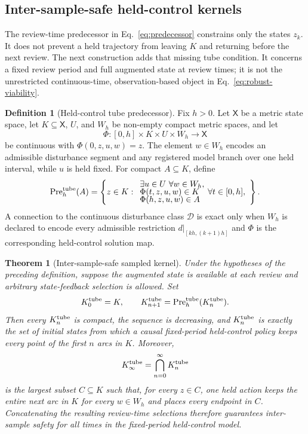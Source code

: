 \documentclass[11pt]{article}
\newtheorem{theorem}{Theorem}
\theoremstyle{definition}
\newtheorem{definition}{Definition}
\newcommand{\Pre}{\operatorname{Pre}}
\begin{document}
\subsection{Inter-sample-safe held-control kernels}

The review-time predecessor in Eq.~\eqref{eq:predecessor} constrains only the states $z_k$. It does not prevent a held trajectory from leaving $K$ and returning before the next review. The next construction adds that missing tube condition. It concerns a fixed review period and full augmented state at review times; it is not the unrestricted continuous-time, observation-based object in Eq.~\eqref{eq:robust-viability}.

\begin{definition}[Held-control tube predecessor]
Fix $h>0$. Let $\mathsf X$ be a metric state space, let $K\subseteq \mathsf X$, $U$, and $W_h$ be non-empty compact metric spaces, and let
\[
\Phi:[0,h]\times K\times U\times W_h\to \mathsf X
\]
be continuous with $\Phi(0,z,u,w)=z$. The element $w\in W_h$ encodes an admissible disturbance segment and any registered model branch over one held interval, while $u$ is held fixed. For compact $A\subseteq K$, define
\begin{equation}
\Pre_h^{\rm tube}(A)=
\left\{z\in K:\begin{array}{l}
\exists u\in U\ \forall w\in W_h,\\[-1mm]
\Phi(t,z,u,w)\in K\quad\forall t\in[0,h],\\[-1mm]
\Phi(h,z,u,w)\in A
\end{array}\right\}.
\label{eq:tube-predecessor}
\end{equation}
A connection to the continuous disturbance class $\mathcal D$ is exact only when $W_h$ is declared to encode every admissible restriction $d|_{[kh,(k+1)h]}$ and $\Phi$ is the corresponding held-control solution map.
\end{definition}

\begin{theorem}[Inter-sample-safe sampled kernel]
\label{thm:tube-viability}
Under the hypotheses of the preceding definition, suppose the augmented state is available at each review and arbitrary state-feedback selection is allowed. Set
\[
K^{\rm tube}_0=K,
\qquad
K^{\rm tube}_{n+1}=\Pre_h^{\rm tube}(K^{\rm tube}_n).
\]
Then every $K^{\rm tube}_n$ is compact, the sequence is decreasing, and $K^{\rm tube}_n$ is exactly the set of initial states from which a causal fixed-period held-control policy keeps every point of the first $n$ arcs in $K$. Moreover,
\begin{equation}
K^{\rm tube}_\infty=\bigcap_{n=0}^{\infty}K^{\rm tube}_n
\label{eq:tube-kernel}
\end{equation}
is the largest subset $C\subseteq K$ such that, for every $z\in C$, one held action keeps the entire next arc in $K$ for every $w\in W_h$ and places every endpoint in $C$. Concatenating the resulting review-time selections therefore guarantees inter-sample safety for all times in the fixed-period held-control model.
\end{theorem}
\end{document}

